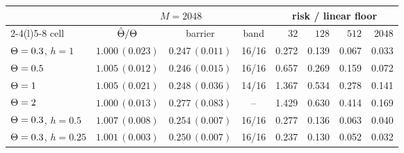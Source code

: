 \begin{tabular}{@{}l c c c r r r r@{}}
\toprule
& \multicolumn{3}{c}{$M=2048$} & \multicolumn{4}{c}{risk / linear floor} \\
\cmidrule(lr){2-4}\cmidrule(l){5-8}
cell & $\hat{\Theta}/\Theta$ & barrier & band & $32$ & $128$ & $512$ & $2048$ \\
\midrule
$\Theta=0.3$, $h=1$ & $1.000\,(0.023)$ & $0.247\,(0.011)$ & 16/16 & 0.272 & 0.139 & 0.067 & 0.033 \\
$\Theta=0.5$ & $1.005\,(0.012)$ & $0.246\,(0.015)$ & 16/16 & 0.657 & 0.269 & 0.159 & 0.072 \\
$\Theta=1$ & $1.005\,(0.021)$ & $0.248\,(0.036)$ & 14/16 & 1.367 & 0.534 & 0.278 & 0.141 \\
$\Theta=2$ & $1.000\,(0.013)$ & $0.277\,(0.083)$ & -- & 1.429 & 0.630 & 0.414 & 0.169 \\
$\Theta=0.3$, $h=0.5$ & $1.007\,(0.008)$ & $0.254\,(0.007)$ & 16/16 & 0.277 & 0.136 & 0.063 & 0.040 \\
$\Theta=0.3$, $h=0.25$ & $1.001\,(0.003)$ & $0.250\,(0.007)$ & 16/16 & 0.237 & 0.130 & 0.052 & 0.032 \\
\bottomrule
\end{tabular}
